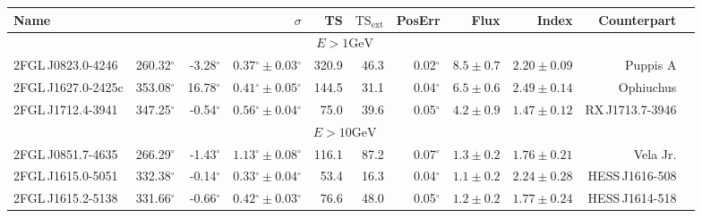 \documentclass[12pt,preprint]{aastex}
\newcommand{\gev}{\text{GeV}\xspace}
\newcommand{\tsext}{{\ensuremath{\text{TS}_\text{ext}}}\xspace}
\newcommand{\glon}{\text{GLON}\xspace}
\newcommand{\glat}{\text{GLAT}\xspace}
\renewcommand{\deg}{\ensuremath{^\circ}\xspace}
\begin{document}


\clearpage
\begin{table}
  \begin{centering}
    \begin{tabular}{l|rrrrrrrrrr}
      \hline
      \hline
      Name                 &          \glon &          \glat &                    $\sigma$ &         TS &   $\tsext$ &     PosErr &                  Flux &                 Index &          Counterpart \\
      \hline
      \multicolumn{10}{c}{$E > 1 \gev$} \\
      \hline
      2FGL\,J0823.0-4246   &     260.32\deg &      -3.28\deg & $  0.37\deg \pm   0.03\deg$ &      320.9 &       46.3 &   0.02\deg & $    8.5 \pm     0.7$ & $   2.20 \pm    0.09$ &             Puppis A \\
      2FGL\,J1627.0-2425c  &     353.08\deg &      16.78\deg & $  0.41\deg \pm   0.05\deg$ &      144.5 &       31.1 &   0.04\deg & $    6.5 \pm     0.6$ & $   2.49 \pm    0.14$ &            Ophiuchus \\
      2FGL\,J1712.4-3941   &     347.25\deg &      -0.54\deg & $  0.56\deg \pm   0.04\deg$ &       75.0 &       39.6 &   0.05\deg & $    4.2 \pm     0.9$ & $   1.47 \pm    0.12$ &     RX\,J1713.7-3946 \\
      \hline
      \multicolumn{10}{c}{$E > 10 \gev$} \\
      \hline
      2FGL\,J0851.7-4635   &     266.29\deg &      -1.43\deg & $  1.13\deg \pm   0.08\deg$ &      116.1 &       87.2 &   0.07\deg & $    1.3 \pm     0.2$ & $   1.76 \pm    0.21$ &             Vela Jr. \\
      2FGL\,J1615.0-5051   &     332.38\deg &      -0.14\deg & $  0.33\deg \pm   0.04\deg$ &       53.4 &       16.3 &   0.04\deg & $    1.1 \pm     0.2$ & $   2.24 \pm    0.28$ &      HESS\,J1616-508 \\
      2FGL\,J1615.2-5138   &     331.66\deg &      -0.66\deg & $  0.42\deg \pm   0.03\deg$ &       76.6 &       48.0 &   0.05\deg & $    1.2 \pm     0.2$ & $   1.77 \pm    0.24$ &      HESS\,J1614-518 \\

\end{tabular}
\end{centering}
\end{table}
\end{document}
